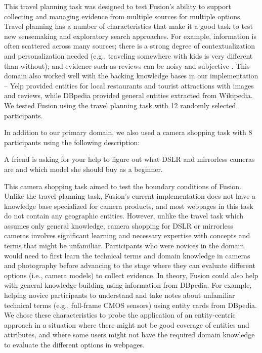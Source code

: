 \noindent This travel planning task was designed to test Fusion's ability to support collecting and managing evidence from multiple sources for multiple options. Travel planning has a number of characteristics that make it a good task to test new sensemaking and exploratory search approaches. For example, information is often scattered across many sources; there is a strong degree of contextualization and personalization needed (e.g., traveling somewhere with kids is very different than without); and evidence such as reviews can be noisy and subjective \cite{zhang2012human,chen2015tripplanner}.  This domain also worked well with the backing knowledge bases in our implementation -- Yelp provided entities for local restaurants and tourist attractions with images and reviews, while DBpedia provided general entities extracted from Wikipedia. We tested Fusion using the travel planning task with 12 randomly selected participants. 

In addition to our primary domain, we also used a camera shopping task with 8 participants using the following description:

\begin{tightquote}
A friend is asking for your help to figure out what DSLR and mirrorless cameras are and which model she should buy as a beginner.
\end{tightquote}

\noindent This camera shopping task aimed to test the boundary conditions of Fusion. Unlike the travel planning task, Fusion's current implementation does not have a knowledge base specialized for camera products, and most webpages in this task do not contain any geographic entities. However, unlike the travel task which assumes only general knowledge, camera shopping for DSLR or mirrorless cameras involves significant learning and necessary expertise with concepts and terms that might be unfamiliar. Participants who were novices in the domain would need to first learn the technical terms and domain knowledge in cameras and photography before advancing to the stage where they can evaluate different options (i.e., camera models) to collect evidence. In theory, Fusion could also help with general knowledge-building using information from DBpedia. For example, helping novice participants to understand and take notes about unfamiliar technical terms (e.g., full-frame CMOS sensors) using entity cards from DBpedia. We chose these characteristics to probe the application of an entity-centric approach in a situation where there might not be good coverage of entities and attributes, and where some users might not have the required domain knowledge to evaluate the different options in webpages. 


